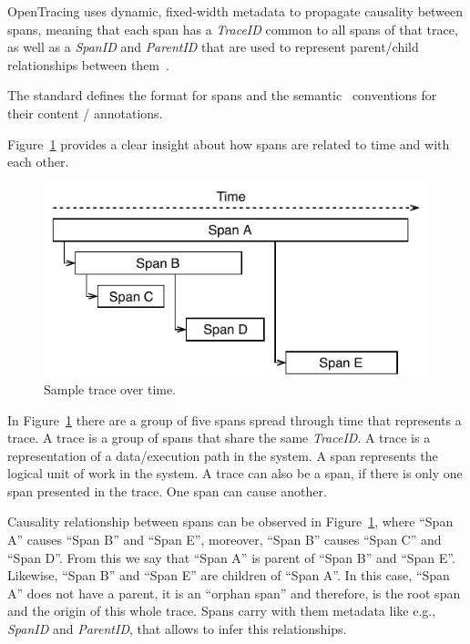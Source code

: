 OpenTracing uses dynamic, fixed-width metadata to propagate causality between spans, meaning that each span has a \emph{TraceID} common to all spans of that trace, as well as a \emph{SpanID} and \emph{ParentID} that are used to represent parent/child relationships between them~\cite{sambasivan2014so}.

The standard defines the format for spans and the semantic~\cite{open_tracing_semantic_specification, open_tracing_semantic_conventions} conventions for their content / annotations.


Figure~\ref{fig:sample_trace_over_time} provides a clear insight about how spans are related to time and with each other.

\begin{figure}[H]
    \centerline{\includegraphics[width=1.0\linewidth]{images/trace.pdf}}
    \caption{Sample trace over time.}
    \label{fig:sample_trace_over_time}
\end{figure}

In Figure~\ref{fig:sample_trace_over_time} there are a group of five spans spread through time that represents a trace. A trace is a group of spans that share the same \emph{TraceID}.  A trace is a representation of a data/execution path in the system. A span represents the logical unit of work in the system. A trace can also be a span, if there is only one span presented in the trace. One span can cause another.

Causality relationship between spans can be observed in Figure~\ref{fig:sample_trace_over_time}, where ``Span A'' causes ``Span B'' and ``Span E'', moreover, ``Span B'' causes ``Span C'' and ``Span D''. From this we say that ``Span A'' is parent of ``Span B'' and ``Span E''. Likewise, ``Span B'' and ``Span E'' are children of ``Span A''. In this case, ``Span A'' does not have a parent, it is an ``orphan span'' and therefore, is the root span and the origin of this whole trace. Spans carry with them metadata like e.g., \emph{SpanID} and \emph{ParentID}, that allows to infer this relationships.

